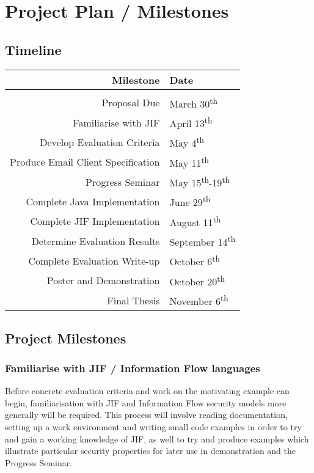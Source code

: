 \section{Project Plan / Milestones}

\subsection{Timeline}

\begin{tabular}{r|l}
	Milestone & Date \\\hline\\
	Proposal Due & March 30\textsuperscript{th} \\
	Familiarise with JIF & April 13\textsuperscript{th} \\
	Develop Evaluation Criteria & May 4\textsuperscript{th} \\
	Produce Email Client Specification & May 11\textsuperscript{th} \\
	Progress Seminar & May 15\textsuperscript{th}-19\textsuperscript{th} \\
	Complete Java Implementation & June 29\textsuperscript{th} \\
	Complete JIF Implementation & August 11\textsuperscript{th} \\
	Determine Evaluation Results & September 14\textsuperscript{th} \\
	Complete Evaluation Write-up & October 6\textsuperscript{th}\\
	Poster and Demonstration & October 20\textsuperscript{th} \\
	Final Thesis & November 6\textsuperscript{th} \\
\end{tabular}

\subsection{Project Milestones}

\subsubsection{Familiarise with JIF / Information Flow languages}

Before concrete evaluation criteria and work on the motivating example can begin, familiarisation with JIF and Information Flow security models more generally will be required. This process will involve reading documentation, setting up a work environment and writing small code examples in order to try and gain a working knowledge of JIF, as well to try and produce examples which illustrate particular security properties for later use in demonstration and the Progress Seminar.

